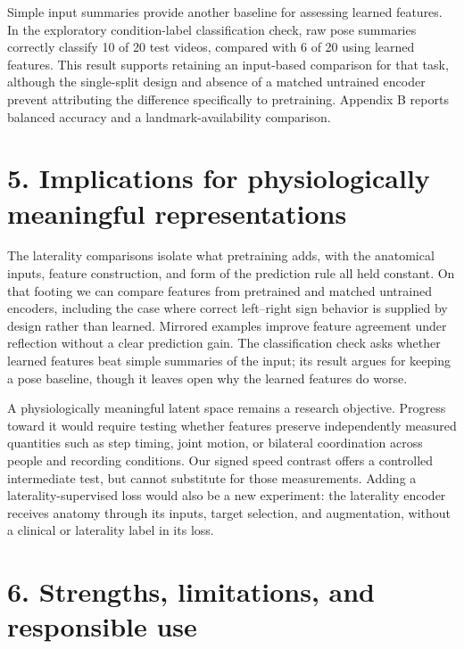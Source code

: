 \documentclass{article}
\begin{document}
Simple input summaries provide another baseline for assessing learned
features. In the exploratory condition-label classification check, raw
pose summaries correctly classify 10 of 20 test videos, compared with 6
of 20 using learned features. This result supports retaining an
input-based comparison for that task, although the single-split design
and absence of a matched untrained encoder prevent attributing the
difference specifically to pretraining. Appendix B reports balanced
accuracy and a landmark-availability comparison.


\section{5. Implications for physiologically meaningful
representations}\label{implications-for-physiologically-meaningful-representations}

The laterality comparisons isolate what pretraining adds, with the
anatomical inputs, feature construction, and form of the prediction rule
all held constant. On that footing we can compare features from
pretrained and matched untrained encoders, including the case where
correct left--right sign behavior is supplied by design rather than
learned. Mirrored examples improve feature agreement under reflection
without a clear prediction gain. The classification check asks whether
learned features beat simple summaries of the input; its result argues
for keeping a pose baseline, though it leaves open why the learned
features do worse.

A physiologically meaningful latent space remains a research objective.
Progress toward it would require testing whether features preserve
independently measured quantities such as step timing, joint motion, or
bilateral coordination across people and recording conditions. Our
signed speed contrast offers a controlled intermediate test, but cannot
substitute for those measurements. Adding a laterality-supervised loss
would also be a new experiment: the laterality encoder receives anatomy
through its inputs, target selection, and augmentation, without a
clinical or laterality label in its loss.

\section{6. Strengths, limitations, and responsible
use}\label{strengths-limitations-and-responsible-use}
\end{document}
